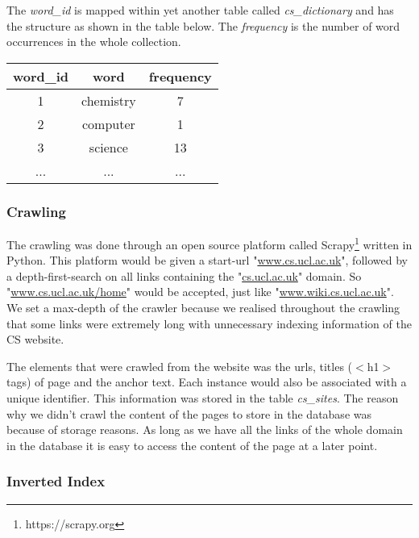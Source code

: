 The \emph{word\_id} is mapped within yet another table called \emph{cs\_dictionary} and has the structure as shown in the table below. The \emph{frequency} is the number of word occurrences in the whole collection.

\begin{table}[h!]
  \begin{tabular}{|c|c|c|}
  \hline
  word\_id & word & frequency \\ \hline 
  1 & chemistry & 7 \\\hline
  2 & computer & 1 \\\hline
  3 &science & 13 \\\hline
  ... & ... & ...
  \end{tabular}
\end{table}


\subsubsection{Crawling} %
\label{ssub:crawling}

The crawling was done through an open source platform called Scrapy\footnote{https://scrapy.org} written in Python. This platform would be given a start-url "\url{www.cs.ucl.ac.uk}", followed by a depth-first-search on all links containing the "\url{cs.ucl.ac.uk}" domain. So "\url{www.cs.ucl.ac.uk/home}" would be accepted, just like "\url{www.wiki.cs.ucl.ac.uk}". We set a max-depth of the crawler because we realised throughout the crawling that some links were extremely long with unnecessary indexing information of the CS website.

The elements that were crawled from the website was the urls, titles ($<$h1$>$ tags) of page and the anchor text. Each instance would also be associated with a unique identifier. This information was stored in the table \emph{cs\_sites}. The reason why we didn't crawl the content of the pages to store in the database was because of storage reasons. As long as we have all the links of the whole domain in the database it is easy to access the content of the page at a later point.


\subsubsection{Inverted Index} %
\label{ssub:inverted_index}


